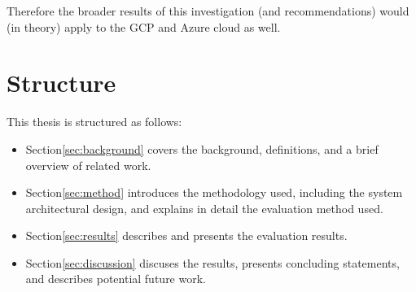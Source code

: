Therefore the broader results of this investigation (and recommendations) would (in theory) apply to the GCP and Azure cloud as well.

\chapter{Structure}
This thesis is structured as follows:
\begin{itemize}
  \item Section\ref{sec:background} covers the background, definitions, and a brief overview of related work.
  \item Section\ref{sec:method} introduces the methodology used, including the system architectural design, and explains in detail the evaluation method used.
  \item Section\ref{sec:results} describes and presents the evaluation results.
  \item Section\ref{sec:discussion} discuses the results, presents concluding statements, and describes potential future work.
\end{itemize}
